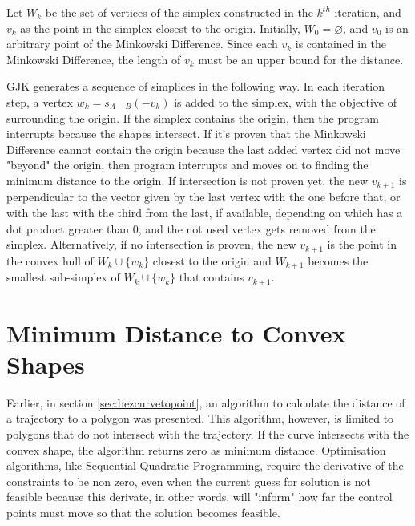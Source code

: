 \par Let $W_k$ be the set of vertices of the simplex constructed in the $k^{th}$ iteration, and $v_k$ as the point in the simplex closest to the origin. Initially, $W_0=\varnothing$, and $v_0$ is an arbitrary point of the Minkowski Difference. Since each $v_k$ is contained in the Minkowski Difference, the length of $v_k$ must be an upper bound for the distance.
\par \ac{GJK} generates a sequence of simplices in the following way. In each iteration step, a vertex $w_k = s_{A-B}(-v_k)$ is added to the simplex, with the objective of surrounding the origin. If the simplex contains the origin, then the program interrupts because the shapes intersect. If it's proven that the Minkowski Difference cannot contain the origin because the last added vertex did not move "beyond" the origin, then program interrupts and moves on to finding the minimum distance to the origin. If intersection is not proven yet, the new $v_{k+1}$ is perpendicular to the vector given by the last vertex with the one before that, or with the last with the third from the last, if available, depending on which has a dot product greater than 0, and the not used vertex gets removed from the simplex. Alternatively, if no intersection is proven, the new $v_{k+1}$ is the point in the convex hull of $W_k\cup \{w_k\}$ closest to the origin and $W_{k+1}$ becomes the smallest sub-simplex of $W_k\cup \{w_k\}$ that contains $v_{k+1}$.


\section{Minimum Distance to Convex Shapes}
\label{sev:mindistconvshapes}

\par Earlier, in section \ref{sec:bezcurvetopoint}, an algorithm to calculate the distance of a trajectory to a polygon was presented. This algorithm, however, is limited to polygons that do not intersect with the trajectory. If the curve intersects with the convex shape, the algorithm returns zero as minimum distance. Optimisation algorithms, like Sequential Quadratic Programming, require the derivative of the constraints to be non zero, even when the current guess for solution is not feasible because this derivate, in other words, will "inform" how far the control points must move so that the solution becomes feasible.


